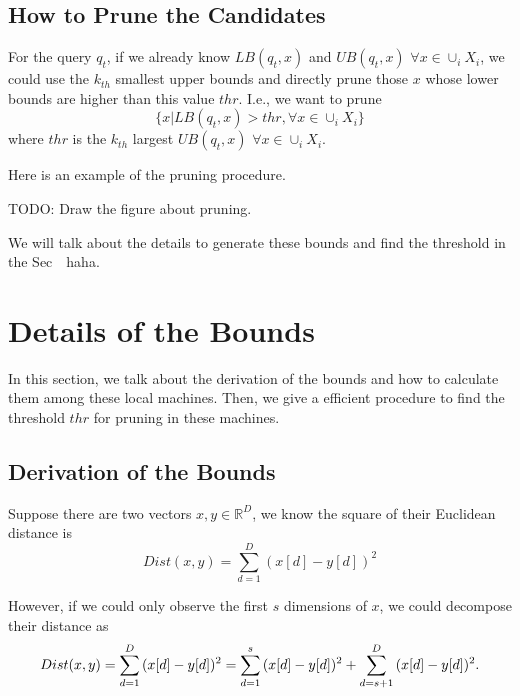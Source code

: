 
\subsection{How to Prune the Candidates} %
\label{ss:prune_the_candidates}

For the query $q_t$, if we already know $LB(q_t,x)$ and $UB(q_t,x)$ $\forall x\in \cup_i X_i$, we could use the $k_{th}$ smallest upper bounds and directly prune those $x$ whose lower bounds are higher than this value $thr$. I.e., we want to prune
\[
\{x |LB(q_t,x)>thr, \forall x \in \cup_i X_i\}
\]
where $thr$ is the $k_{th}$ largest $UB(q_t,x)$ $\forall x\in \cup_i X_i$.

Here is an example of the pruning procedure.

TODO: Draw the figure about pruning.

We will talk about the details to generate these bounds and find the threshold in the Sec~~haha.


\section{Details of the Bounds} %
\label{s:details_of_the_bounds}

In this section, we talk about the derivation of the bounds and how to calculate them among these local machines.  Then, we give a efficient procedure to find the threshold $thr$ for pruning in these machines.


\subsection{Derivation of the Bounds} %
\label{ss:derivation_of_the_bounds}

Suppose there are two vectors $x,y\in \mathbb{R}^D$, we know the square of their Euclidean distance is 
\begin{equation}
	Dist(x,y)=\sum^D_{d=1}{(x[d]-y[d])^2}
\end{equation}

However, if we could only observe the first $s$ dimensions of $x$, we could decompose their distance as 
\begin{equation}\label{eq:Eu_decomp}
	Dist(x,y)=\sum^D_{d=1}{(x[d]-y[d])^2}\\
				=\sum^s_{d=1}{(x[d]-y[d])^2} + \sum^D_{d=s+1}{(x[d]-y[d])^2.}	
\end{equation}

